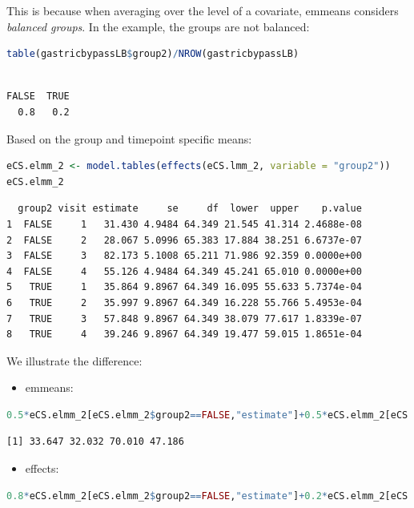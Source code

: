 \documentclass[12pt]{article}
\begin{document}
This is because when averaging over the level of a covariate, emmeans
considers \emph{balanced groups}. In the example, the groups are not
balanced:
\begin{lstlisting}[language=r,numbers=none]
table(gastricbypassLB$group2)/NROW(gastricbypassLB)
\end{lstlisting}

\label{}
\begin{verbatim}

FALSE  TRUE 
  0.8   0.2
\end{verbatim}


Based on the group and timepoint specific means:
\begin{lstlisting}[language=r,numbers=none]
eCS.elmm_2 <- model.tables(effects(eCS.lmm_2, variable = "group2"))
eCS.elmm_2
\end{lstlisting}

\label{}
\begin{verbatim}
  group2 visit estimate     se     df  lower  upper    p.value
1  FALSE     1   31.430 4.9484 64.349 21.545 41.314 2.4688e-08
2  FALSE     2   28.067 5.0996 65.383 17.884 38.251 6.6737e-07
3  FALSE     3   82.173 5.1008 65.211 71.986 92.359 0.0000e+00
4  FALSE     4   55.126 4.9484 64.349 45.241 65.010 0.0000e+00
5   TRUE     1   35.864 9.8967 64.349 16.095 55.633 5.7374e-04
6   TRUE     2   35.997 9.8967 64.349 16.228 55.766 5.4953e-04
7   TRUE     3   57.848 9.8967 64.349 38.079 77.617 1.8339e-07
8   TRUE     4   39.246 9.8967 64.349 19.477 59.015 1.8651e-04
\end{verbatim}


We illustrate the difference:
\begin{itemize}
\item emmeans:
\end{itemize}
\begin{lstlisting}[language=r,numbers=none]
0.5*eCS.elmm_2[eCS.elmm_2$group2==FALSE,"estimate"]+0.5*eCS.elmm_2[eCS.elmm_2$group2==TRUE,"estimate"]
\end{lstlisting}

\label{}
\begin{verbatim}
[1] 33.647 32.032 70.010 47.186
\end{verbatim}


\begin{itemize}
\item effects:
\end{itemize}
\begin{lstlisting}[language=r,numbers=none]
0.8*eCS.elmm_2[eCS.elmm_2$group2==FALSE,"estimate"]+0.2*eCS.elmm_2[eCS.elmm_2$group2==TRUE,"estimate"]
\end{lstlisting}
\end{document}
